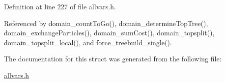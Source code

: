Definition at line 227 of file allvars.h.



Referenced by domain\_\-countToGo(), domain\_\-determineTopTree(), domain\_\-exchangeParticles(), domain\_\-sumCost(), domain\_\-topsplit(), domain\_\-topsplit\_\-local(), and force\_\-treebuild\_\-single().



The documentation for this struct was generated from the following file:\begin{DoxyCompactItemize}
\item 
\hyperlink{allvars_8h}{allvars.h}\end{DoxyCompactItemize}
